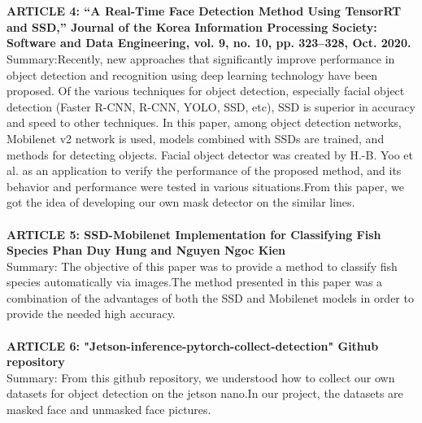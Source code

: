 \\ \\
\textbf{ARTICLE 4: “A Real-Time Face Detection Method Using TensorRT and SSD,” Journal of the Korea Information Processing Society: Software and Data Engineering, vol. 9, no. 10, pp. 323–328, Oct. 2020.
  }\\
Summary:Recently, new approaches that significantly improve performance in object detection and recognition using deep learning technology have been proposed. Of the various techniques for object detection, especially facial object detection (Faster R-CNN, R-CNN, YOLO, SSD, etc), SSD is superior in accuracy and speed to other techniques. In this paper, among object detection networks, Mobilenet v2 network is used, models combined with SSDs are trained, and methods for detecting objects. 
Facial object detector was created by H.-B. Yoo et al. as an application to verify the performance of the proposed method, and its behavior and performance were tested in various situations.From this paper, we got the idea of developing our own mask detector on the similar lines.
 \\ \\
\textbf{ARTICLE 5: SSD-Mobilenet Implementation for Classifying Fish Species
Phan Duy Hung and Nguyen Ngoc Kien
}\\
Summary:
The objective of this paper was to provide a method to classify fish species automatically via images.The method presented in this paper was a combination of the advantages of both the SSD and Mobilenet models in order to provide the needed high accuracy.
 \\ \\
\textbf{ARTICLE 6: "Jetson-inference-pytorch-collect-detection" Github repository
}\\
Summary:
 From this github repository, we understood how to collect our own datasets for object detection on the jetson nano.In our project, the datasets are masked face and unmasked face pictures.

